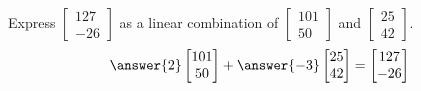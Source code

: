 \documentclass{ximera}
\author{}
\begin{document}
\begin{exercise}
Express $\begin{bmatrix}127\\-26\end{bmatrix}$ as a linear combination of $\begin{bmatrix}101\\50\end{bmatrix}$ and $\begin{bmatrix}25\\42\end{bmatrix}$.
$$\answer{2}\begin{bmatrix}101\\50\end{bmatrix}+\answer{-3}\begin{bmatrix}25\\42\end{bmatrix}=\begin{bmatrix}127\\-26\end{bmatrix}$$
\end{exercise}
\end{document}
